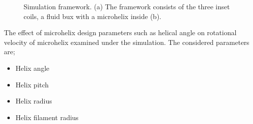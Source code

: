 \documentclass[12pt,a4paper,titlepage]{report}
\begin{document}
\begin{figure}
        \caption[Simulation framework]{Simulation framework. (a) The framework consists of the three inset coils,
a fluid bux with a microhelix inside (b).}\label{Simulation framework}

       

\end{figure}

The effect of microhelix design parameters such as helical angle on rotational velocity of microhelix examined
under the simulation. The considered parameters are;
  
\begin{itemize}
  \item Helix angle
  \item Helix pitch
  \item Helix radius
  \item Helix filament radius
\end{itemize}
\end{document}
